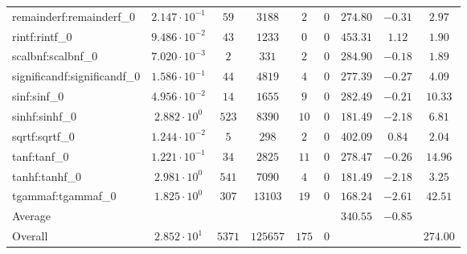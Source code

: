 \begin{tabular}{|l|c|c|c|c|c|c|c|c|}
remainderf:remainderf\_0     & $ 2.147 \cdot 10^{-1} $ & $ 59     $ & $ 3188   $ & $ 2   $ & $ 0   $ & $ 274.80      $ & $ -0.31   $ & $ 2.97    $ \\
rintf:rintf\_0               & $ 9.486 \cdot 10^{-2} $ & $ 43     $ & $ 1233   $ & $ 0   $ & $ 0   $ & $ 453.31      $ & $ 1.12    $ & $ 1.90    $ \\
scalbnf:scalbnf\_0           & $ 7.020 \cdot 10^{-3} $ & $ 2      $ & $ 331    $ & $ 2   $ & $ 0   $ & $ 284.90      $ & $ -0.18   $ & $ 1.89    $ \\
significandf:significandf\_0 & $ 1.586 \cdot 10^{-1} $ & $ 44     $ & $ 4819   $ & $ 4   $ & $ 0   $ & $ 277.39      $ & $ -0.27   $ & $ 4.09    $ \\
sinf:sinf\_0                 & $ 4.956 \cdot 10^{-2} $ & $ 14     $ & $ 1655   $ & $ 9   $ & $ 0   $ & $ 282.49      $ & $ -0.21   $ & $ 10.33   $ \\
sinhf:sinhf\_0               & $ 2.882 \cdot 10^{0}  $ & $ 523    $ & $ 8390   $ & $ 10  $ & $ 0   $ & $ 181.49      $ & $ -2.18   $ & $ 6.81    $ \\
sqrtf:sqrtf\_0               & $ 1.244 \cdot 10^{-2} $ & $ 5      $ & $ 298    $ & $ 2   $ & $ 0   $ & $ 402.09      $ & $ 0.84    $ & $ 2.04    $ \\
tanf:tanf\_0                 & $ 1.221 \cdot 10^{-1} $ & $ 34     $ & $ 2825   $ & $ 11  $ & $ 0   $ & $ 278.47      $ & $ -0.26   $ & $ 14.96   $ \\
tanhf:tanhf\_0               & $ 2.981 \cdot 10^{0}  $ & $ 541    $ & $ 7090   $ & $ 4   $ & $ 0   $ & $ 181.49      $ & $ -2.18   $ & $ 3.25    $ \\
tgammaf:tgammaf\_0           & $ 1.825 \cdot 10^{0}  $ & $ 307    $ & $ 13103  $ & $ 19  $ & $ 0   $ & $ 168.24      $ & $ -2.61   $ & $ 42.51   $ \\
\hline
Average                      & $                     $ & $        $ & $        $ & $     $ & $     $ & $ 340.55      $ & $ -0.85   $ & $         $ \\
\hline
Overall                      & $ 2.852 \cdot 10^{1}  $ & $ 5371   $ & $ 125657 $ & $ 175 $ & $ 0   $ & $             $ & $         $ & $ 274.00  $ \\
\hline
\end{tabular}

